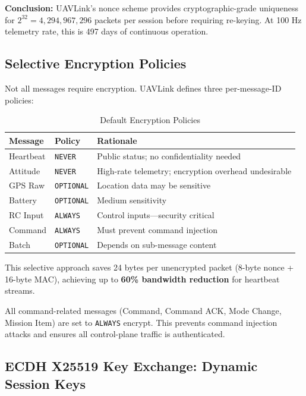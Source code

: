 \documentclass[11pt,a4paper]{article}
\begin{document}
\textbf{Conclusion:} UAVLink's nonce scheme provides cryptographic-grade uniqueness for $2^{32} = 4{,}294{,}967{,}296$ packets per session before requiring re-keying. At 100 Hz telemetry rate, this is 497 days of continuous operation.

\subsection{Selective Encryption Policies}

Not all messages require encryption. UAVLink defines three per-message-ID policies:

\begin{table}[H]
\centering
\begin{tabular}{@{}lll@{}}
\toprule
\textbf{Message} & \textbf{Policy} & \textbf{Rationale} \\
\midrule
Heartbeat  & \texttt{NEVER}    & Public status; no confidentiality needed \\
Attitude   & \texttt{NEVER}    & High-rate telemetry; encryption overhead undesirable \\
GPS Raw    & \texttt{OPTIONAL} & Location data may be sensitive \\
Battery    & \texttt{OPTIONAL} & Medium sensitivity \\
RC Input   & \texttt{ALWAYS}   & Control inputs---security critical \\
Command    & \texttt{ALWAYS}   & Must prevent command injection \\
Batch      & \texttt{OPTIONAL} & Depends on sub-message content \\
\bottomrule
\end{tabular}
\caption{Default Encryption Policies}
\end{table}

This selective approach saves 24 bytes per unencrypted packet (8-byte nonce + 16-byte MAC), achieving up to \textbf{60\% bandwidth reduction} for heartbeat streams.

\begin{notebox}
All command-related messages (Command, Command ACK, Mode Change, Mission Item) are set to \texttt{ALWAYS} encrypt. This prevents command injection attacks and ensures all control-plane traffic is authenticated.
\end{notebox}

\subsection{ECDH X25519 Key Exchange: Dynamic Session Keys}
\end{document}
